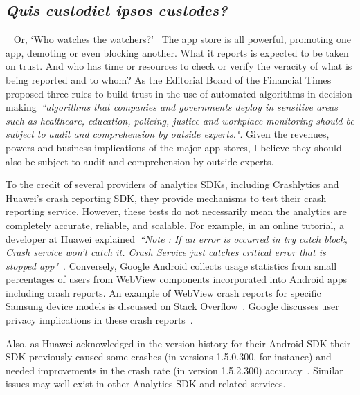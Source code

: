 \subsection{\emph{Quis custodiet ipsos custodes?}}~\label{discussion-quis-custodiet-ipsos-custodes-topic}
Or, `Who watches the watchers?'~ 
The app store is all powerful, promoting one app, demoting or even blocking another. What it reports is expected to be taken on trust. And who has time or resources to check or verify the veracity of what is being reported and to whom? As the Editorial Board of the Financial Times proposed three rules to build trust in the use of automated algorithms in decision making~\emph{``algorithms that companies and governments deploy in sensitive areas such as healthcare, education, policing, justice and workplace monitoring should be subject to audit and comprehension by outside experts."}. Given the revenues, powers and business implications of the major app stores, I believe they should also be subject to audit and comprehension by outside experts.

To the credit of several providers of analytics SDKs, including Crashlytics and Huawei's crash reporting SDK, they provide mechanisms to test their crash reporting service. However, these tests do not necessarily mean the analytics are completely accurate, reliable, and scalable. For example, in an online tutorial, a developer at Huawei explained~\emph{``Note : If an error is occurred in try catch block, Crash service won’t catch it. Crash Service just catches critical error that is stopped app"}~. Conversely, Google Android collects usage statistics from small percentages of users from WebView components incorporated into Android apps including crash reports. An example of WebView crash reports for specific Samsung device models is discussed on Stack Overflow~. Google discusses user privacy implications in these crash reports~.

Also, as Huawei acknowledged in the version history for their Android SDK their SDK previously caused some crashes (in versions 1.5.0.300, for instance) and needed improvements in the crash rate (in version 1.5.2.300) accuracy~. Similar issues may well exist in other Analytics SDK and related services. 

